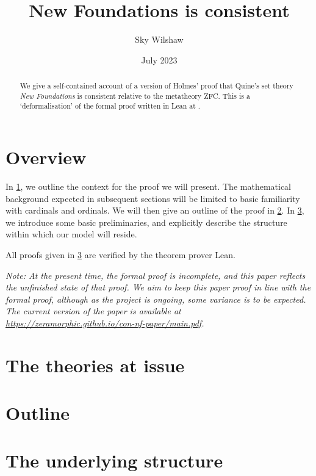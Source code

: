 \documentclass{article}
\title{New Foundations is consistent}
\author{Sky Wilshaw}
\date{July 2023}
\theoremstyle{definition}
\theoremstyle{remark}
\begin{document}
\maketitle

\begin{abstract}
	We give a self-contained account of a version of Holmes' proof \cite{holmes2023nf} that Quine's set theory \emph{New Foundations} \cite{quine-nf} is consistent relative to the metatheory ZFC.
	This is a `deformalisation' of the formal proof written in Lean at \cite{leanprover-community-con-nf}.
\end{abstract}

\tableofcontents

\section*{Overview}

In \cref{sec:theories}, we outline the context for the proof we will present.
The mathematical background expected in subsequent sections will be limited to basic familiarity with cardinals and ordinals.
We will then give an outline of the proof in \cref{sec:outline}.
In \cref{sec:structure}, we introduce some basic preliminaries, and explicitly describe the structure within which our model will reside.

All proofs given in \cref{sec:structure} are verified by the theorem prover Lean.

\emph{
	Note: At the present time, the formal proof \cite{leanprover-community-con-nf} is incomplete, and this paper reflects the unfinished state of that proof.
	We aim to keep this paper proof in line with the formal proof, although as the project is ongoing, some variance is to be expected.
	The current version of the paper is available at \url{https://zeramorphic.github.io/con-nf-paper/main.pdf}.
}

\section{The theories at issue}
\label{sec:theories}


\section{Outline}
\label{sec:outline}


\section{The underlying structure}
\label{sec:structure}


\printbibliography
\end{document}
